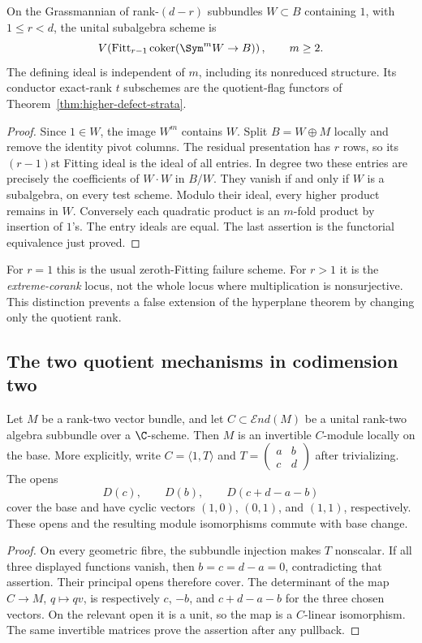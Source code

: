 \begin{proposition}
\label{prop:extreme-corank}
On the Grassmannian of rank-$(d-r)$ subbundles $W\subset B$ containing
$1$, with $1\le r<d$, the unital subalgebra scheme is
\[
 V\!\left(\operatorname{Fitt}_{r-1}
       \operatorname{coker}(\Sym^m W\to B)\right),\qquad m\ge2.
\]
The defining ideal is independent of $m$, including its nonreduced
structure. Its conductor exact-rank $t$ subschemes are the quotient-flag
functors of Theorem~\ref{thm:higher-defect-strata}.
\end{proposition}
\begin{proof}
Since $1\in W$, the image $W^m$ contains $W$. Split $B=W\oplus M$
locally and remove the identity pivot columns. The residual
presentation has $r$ rows, so its $(r-1)$st Fitting ideal is the ideal
of all entries. In degree two these entries are precisely the
coefficients of $W\cdot W$ in $B/W$. They vanish if and only if $W$
is a subalgebra, on every test scheme. Modulo their ideal, every
higher product remains in $W$. Conversely each quadratic product is
an $m$-fold product by insertion of $1$'s. The entry ideals are equal.
The last assertion is the functorial equivalence just proved.
\end{proof}

For $r=1$ this is the usual zeroth-Fitting failure scheme. For $r>1$
it is the \emph{extreme-corank} locus, not the whole locus where
multiplication is nonsurjective. This distinction prevents a false
extension of the hyperplane theorem by changing only the quotient rank.

\subsection{The two quotient mechanisms in codimension two}

\begin{lemma}\label{lem:relative-cyclic-vector}
Let $M$ be a rank-two vector bundle, and let
$C\subset\mathcal E nd(M)$ be a unital rank-two algebra subbundle
over a $\C$-scheme. Then $M$ is an invertible $C$-module locally
on the base. More explicitly, write $C=\langle1,T\rangle$ and
$T=\left(\begin{smallmatrix}a&b\\c&d\end{smallmatrix}\right)$
after trivializing. The opens
\[
 D(c),\qquad D(b),\qquad D(c+d-a-b)
\]
cover the base and have cyclic vectors $(1,0)$, $(0,1)$, and
$(1,1)$, respectively. These opens and the resulting module
isomorphisms commute with base change.
\end{lemma}
\begin{proof}
On every geometric fibre, the subbundle injection makes $T$
nonscalar. If all three displayed functions vanish, then
$b=c=d-a=0$, contradicting that assertion. Their principal opens
therefore cover. The determinant of the map
$C\to M$, $q\mapsto qv$, is respectively $c$, $-b$, and
$c+d-a-b$ for the three chosen vectors. On the relevant open it
is a unit, so the map is a $C$-linear isomorphism. The same
invertible matrices prove the assertion after any pullback.
\end{proof}

